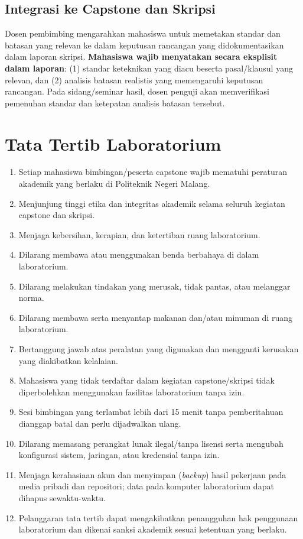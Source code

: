 \documentclass[12pt,a4paper]{report}
\begin{document}
\section{Integrasi ke Capstone dan Skripsi}
Dosen pembimbing mengarahkan mahasiswa untuk memetakan standar dan batasan yang relevan ke dalam keputusan rancangan yang didokumentasikan dalam laporan skripsi. \textbf{Mahasiswa wajib menyatakan secara eksplisit dalam laporan}: (1) standar keteknikan yang diacu beserta pasal/klausul yang relevan, dan (2) analisis batasan realistis yang memengaruhi keputusan rancangan. Pada sidang/seminar hasil, dosen penguji akan memverifikasi pemenuhan standar dan ketepatan analisis batasan tersebut.

\chapter{Tata Tertib Laboratorium}
\label{chap:tatib}

\begin{enumerate}
\item Setiap mahasiswa bimbingan/peserta capstone wajib mematuhi peraturan akademik yang berlaku di Politeknik Negeri Malang.
\item Menjunjung tinggi etika dan integritas akademik selama seluruh kegiatan capstone dan skripsi.
\item Menjaga kebersihan, kerapian, dan ketertiban ruang laboratorium.
\item Dilarang membawa atau menggunakan benda berbahaya di dalam laboratorium.
\item Dilarang melakukan tindakan yang merusak, tidak pantas, atau melanggar norma.
\item Dilarang membawa serta menyantap makanan dan/atau minuman di ruang laboratorium.
\item Bertanggung jawab atas peralatan yang digunakan dan mengganti kerusakan yang diakibatkan kelalaian.
\item Mahasiswa yang tidak terdaftar dalam kegiatan capstone/skripsi tidak diperbolehkan menggunakan fasilitas laboratorium tanpa izin.
\item Sesi bimbingan yang terlambat lebih dari 15 menit tanpa pemberitahuan dianggap batal dan perlu dijadwalkan ulang.
\item Dilarang memasang perangkat lunak ilegal/tanpa lisensi serta mengubah konfigurasi sistem, jaringan, atau kredensial tanpa izin.
\item Menjaga kerahasiaan akun dan menyimpan (\emph{backup}) hasil pekerjaan pada media pribadi dan repositori; data pada komputer laboratorium dapat dihapus sewaktu-waktu.
\item Pelanggaran tata tertib dapat mengakibatkan penangguhan hak penggunaan laboratorium dan dikenai sanksi akademik sesuai ketentuan yang berlaku.
\end{enumerate}
\end{document}
